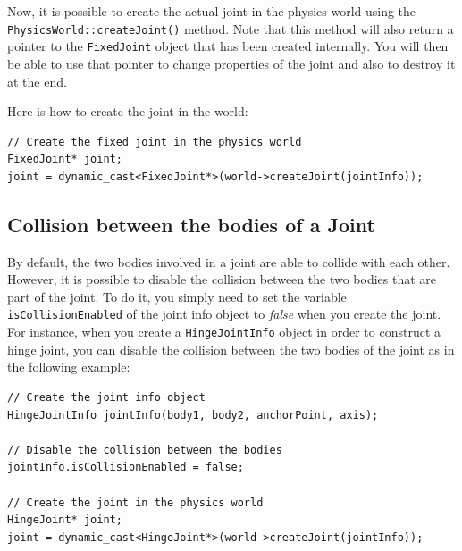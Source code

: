 \documentclass[a4paper,12pt]{article}
\begin{document}
    \vspace{0.6cm}

    \begin{sloppypar}
    Now, it is possible to create the actual joint in the physics world using the \texttt{PhysicsWorld::createJoint()} method.
    Note that this method will also return a pointer to the \texttt{FixedJoint} object that has been created internally. You will then
    be able to use that pointer to change properties of the joint and also to destroy it at the end. \\
    \end{sloppypar}

    Here is how to create the joint in the world: \\

    \begin{lstlisting}
// Create the fixed joint in the physics world
FixedJoint* joint;
joint = dynamic_cast<FixedJoint*>(world->createJoint(jointInfo));
  \end{lstlisting}

    \subsection{Collision between the bodies of a Joint}

    By default, the two bodies involved in a joint are able to collide with each other. However, it is possible to disable the collision between the two bodies that are part
    of the joint. To do it, you simply need to set the variable \texttt{isCollisionEnabled} of the joint info object to \emph{false} when you create the joint. \\

    For instance, when you create a \texttt{HingeJointInfo} object in order to construct a hinge joint, you can disable the collision between the two bodies of the joint as in the
    following example: \\

    \begin{lstlisting}
// Create the joint info object
HingeJointInfo jointInfo(body1, body2, anchorPoint, axis);

// Disable the collision between the bodies
jointInfo.isCollisionEnabled = false;

// Create the joint in the physics world
HingeJoint* joint;
joint = dynamic_cast<HingeJoint*>(world->createJoint(jointInfo));
  \end{lstlisting}
\end{document}
